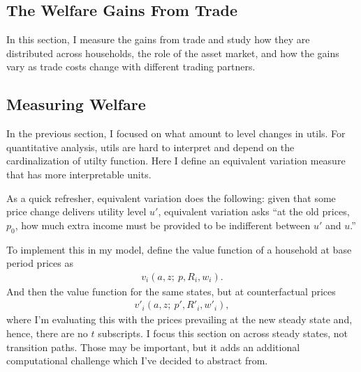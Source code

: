 \documentclass[12pt,pdftex]{article}
\begin{document}
\begin{onehalfspacing}
\section{The Welfare Gains From Trade}

In this section, I measure the gains from trade and study how they are distributed across households, the role of the asset market, and how the gains vary as trade costs change with different trading partners.

\subsection{Measuring Welfare}

In the previous section, I focused on what amount to level changes in utils. For quantitative analysis, utils are hard to interpret and depend on the cardinalization of utilty function. Here I define an equivalent variation measure that has more interpretable units.

As a quick refresher, equivalent variation does the following: given that some price change delivers utility level $u'$, equivalent variation asks ``at the old prices, $p_0$, how much extra income must be provided to be indifferent between $u'$ and $u$.''

To implement this in my model, define the value function of a household at base period prices as
\begin{align}
v_i(a, z ; \ p, R_{i}, w_{i}).
\end{align}
And then the value function for the same states, but at counterfactual prices
\begin{align}
v'_i(a, z ; \ p', R'_{i}, w'_{i}),
\end{align}
where I'm evaluating this with the prices prevailing at the new steady state and, hence, there are no $t$ subscripts. I focus this section on across steady states, not transition paths. Those may be important, but it adds an additional computational challenge which I've decided to abstract from.


\end{onehalfspacing}
\end{document}
